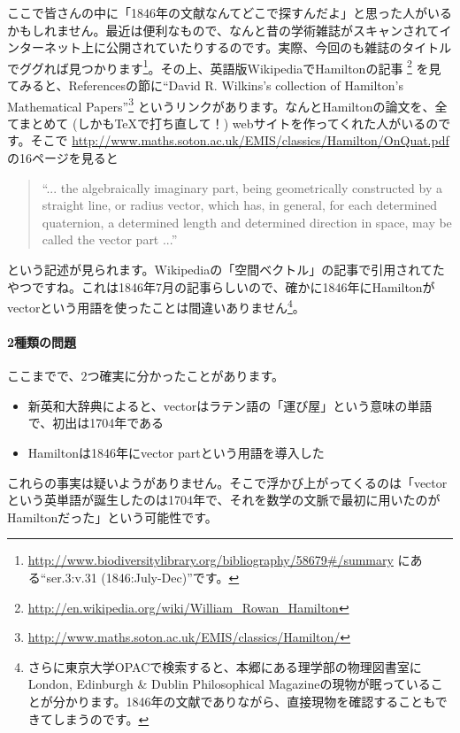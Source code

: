 ここで皆さんの中に「1846年の文献なんてどこで探すんだよ」と思った人がいるかもしれません。最近は便利なもので、なんと昔の学術雑誌がスキャンされてインターネット上に公開されていたりするのです。実際、今回のも雑誌のタイトルでググれば見つかります\footnote{\url{http://www.biodiversitylibrary.org/bibliography/58679\#/summary} にある``ser.3:v.31 (1846:July-Dec)''です。}。その上、英語版WikipediaでHamiltonの記事 \footnote{\url{http://en.wikipedia.org/wiki/William_Rowan_Hamilton}} を見てみると、Referencesの節に``David R. Wilkins's collection of Hamilton's Mathematical Papers''\footnote{\url{http://www.maths.soton.ac.uk/EMIS/classics/Hamilton/}} というリンクがあります。なんとHamiltonの論文を、全てまとめて (しかも\TeX で打ち直して！\negthinspace) webサイトを作ってくれた人がいるのです。そこで \url{http://www.maths.soton.ac.uk/EMIS/classics/Hamilton/OnQuat.pdf} の16ページを見ると
\begin{quotation}
``... the algebraically imaginary part, being geometrically constructed by a straight line, or radius vector, which has, in general, for each determined quaternion, a determined length and determined direction in space, may be called the vector part ...''
\end{quotation}
という記述が見られます。Wikipediaの「空間ベクトル」の記事で引用されてたやつですね。これは1846年7月の記事らしいので、確かに1846年にHamiltonがvectorという用語を使ったことは間違いありません\footnote{さらに東京大学OPACで検索すると、本郷にある理学部の物理図書室にLondon, Edinburgh \& Dublin Philosophical Magazineの現物が眠っていることが分かります。1846年の文献でありながら、直接現物を確認することもできてしまうのです。}。

\paragraph{2種類の問題}

ここまでで、$2$つ確実に分かったことがあります。\vspace{-0.5zw}
\begin{itemize}
\item 新英和大辞典によると、vectorはラテン語の「運び屋」という意味の単語で、初出は1704年である
\item Hamiltonは1846年にvector partという用語を導入した
\end{itemize}\vspace{-0.5zw}
これらの事実は疑いようがありません。そこで浮かび上がってくるのは「vectorという英単語が誕生したのは1704年で、それを数学の文脈で最初に用いたのがHamiltonだった」という可能性です。

